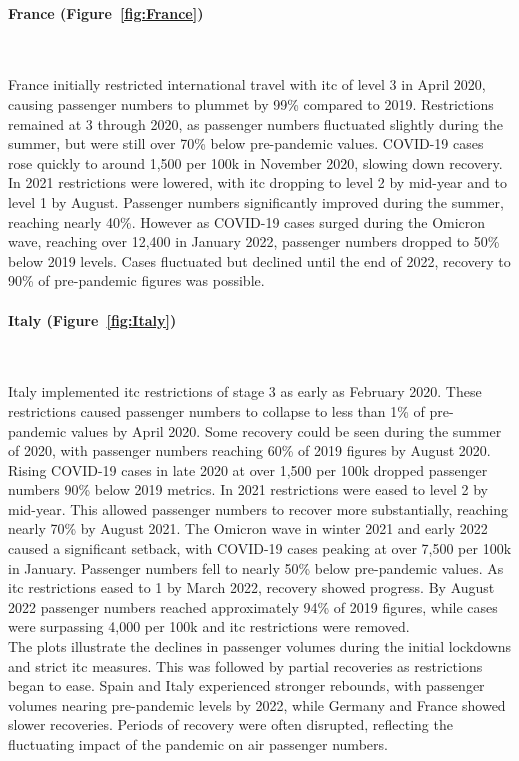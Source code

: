 \documentclass[12pt,onehalfspacing,headsepline,oneside,openright,a4paper, fleqn]{report}
\begin{document}
\newpage

\paragraph{France (Figure~\ref{fig:France})}
\

France initially restricted international travel with \gls{itc} of level 3 in April 2020, causing passenger numbers to plummet by 99\% compared to 2019. Restrictions remained at 3 through 2020, as passenger numbers fluctuated slightly during the summer, but were still over 70\% below pre-pandemic values. COVID-19 cases rose quickly to around 1,500 per 100k in November 2020, slowing down recovery. In 2021 restrictions were lowered, with \gls{itc} dropping to level 2 by mid-year and to level 1 by August. Passenger numbers significantly improved during the summer, reaching nearly 40\%. However as COVID-19 cases surged during the Omicron wave, reaching over 12,400 in January 2022, passenger numbers dropped to 50\% below 2019 levels. Cases fluctuated but declined until the end of 2022, recovery to 90\% of pre-pandemic figures was possible.

\paragraph{Italy (Figure~\ref{fig:Italy})}
\

Italy implemented \gls{itc} restrictions of stage 3 as early as February 2020. These restrictions caused passenger numbers to collapse to less than 1\% of pre-pandemic values by April 2020. Some recovery could be seen during the summer of 2020, with passenger numbers reaching 60\% of 2019 figures by August 2020. Rising COVID-19 cases in late 2020 at over 1,500 per 100k dropped passenger numbers 90\% below 2019 metrics. In 2021 restrictions were eased to level 2 by mid-year. This allowed passenger numbers to recover more substantially, reaching nearly 70\% by August 2021. The Omicron wave in winter 2021 and early 2022 caused a significant setback, with COVID-19 cases peaking at over 7,500 per 100k in January. Passenger numbers fell to nearly 50\% below pre-pandemic values. As \gls{itc} restrictions eased to 1 by March 2022, recovery showed progress. By August 2022 passenger numbers reached approximately 94\% of 2019 figures, while cases were surpassing 4,000 per 100k and \gls{itc} restrictions were removed.
\\


The plots illustrate the declines in passenger volumes during the initial lockdowns and strict \gls{itc} measures. This was followed by partial recoveries as restrictions began to ease. Spain and Italy experienced stronger rebounds, with passenger volumes nearing pre-pandemic levels by 2022, while Germany and France showed slower recoveries. Periods of recovery were often disrupted, reflecting the fluctuating impact of the pandemic on air passenger numbers.
\end{document}
